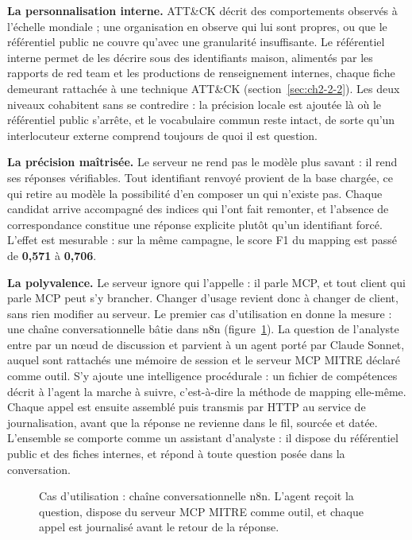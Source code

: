 \textbf{La personnalisation interne.} ATT\&CK décrit des comportements observés à l'échelle mondiale ; une organisation en observe qui lui sont propres, ou que le référentiel public ne couvre qu'avec une granularité insuffisante. Le référentiel interne permet de les décrire sous des identifiants maison, alimentés par les rapports de red team et les productions de renseignement internes, chaque fiche demeurant rattachée à une technique ATT\&CK (section~\ref{sec:ch2-2-2}). Les deux niveaux cohabitent sans se contredire : la précision locale est ajoutée là où le référentiel public s'arrête, et le vocabulaire commun reste intact, de sorte qu'un interlocuteur externe comprend toujours de quoi il est question.

\textbf{La précision maîtrisée.} Le serveur ne rend pas le modèle plus savant : il rend ses réponses vérifiables. Tout identifiant renvoyé provient de la base chargée, ce qui retire au modèle la possibilité d'en composer un qui n'existe pas. Chaque candidat arrive accompagné des indices qui l'ont fait remonter, et l'absence de correspondance constitue une réponse explicite plutôt qu'un identifiant forcé. L'effet est mesurable : sur la même campagne, le score F1 du mapping est passé de \textbf{0,571} à \textbf{0,706}.

\textbf{La polyvalence.} Le serveur ignore qui l'appelle : il parle MCP, et tout client qui parle MCP peut s'y brancher. Changer d'usage revient donc à changer de client, sans rien modifier au serveur. Le premier cas d'utilisation en donne la mesure : une chaîne conversationnelle bâtie dans n8n (figure~\ref{fig:ch2-n8n}). La question de l'analyste entre par un nœud de discussion et parvient à un agent porté par Claude Sonnet, auquel sont rattachés une mémoire de session et le serveur MCP MITRE déclaré comme outil. S'y ajoute une intelligence procédurale : un fichier de compétences décrit à l'agent la marche à suivre, c'est-à-dire la méthode de mapping elle-même. Chaque appel est ensuite assemblé puis transmis par HTTP au service de journalisation, avant que la réponse ne revienne dans le fil, sourcée et datée. L'ensemble se comporte comme un assistant d'analyste : il dispose du référentiel public et des fiches internes, et répond à toute question posée dans la conversation.

\begin{figure}[htbp]
\centering
{}
\caption{Cas d'utilisation : chaîne conversationnelle n8n. L'agent reçoit la question, dispose du serveur MCP MITRE comme outil, et chaque appel est journalisé avant le retour de la réponse.}\label{fig:ch2-n8n}
\end{figure}

